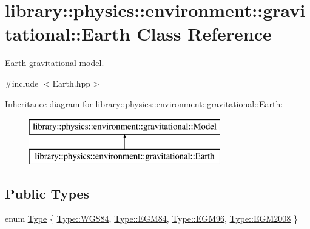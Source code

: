 \hypertarget{classlibrary_1_1physics_1_1environment_1_1gravitational_1_1_earth}{}\section{library\+:\+:physics\+:\+:environment\+:\+:gravitational\+:\+:Earth Class Reference}
\label{classlibrary_1_1physics_1_1environment_1_1gravitational_1_1_earth}


\hyperlink{classlibrary_1_1physics_1_1environment_1_1gravitational_1_1_earth}{Earth} gravitational model.  




{\ttfamily \#include $<$Earth.\+hpp$>$}

Inheritance diagram for library\+:\+:physics\+:\+:environment\+:\+:gravitational\+:\+:Earth\+:\begin{figure}[H]
\begin{center}
\leavevmode
\includegraphics[height=2.000000cm]{classlibrary_1_1physics_1_1environment_1_1gravitational_1_1_earth}
\end{center}
\end{figure}
\subsection*{Public Types}
\begin{DoxyCompactItemize}
\item 
enum \hyperlink{classlibrary_1_1physics_1_1environment_1_1gravitational_1_1_earth_ab20a2b260831c66ac10f7b9a307d25ca}{Type} \{ \hyperlink{classlibrary_1_1physics_1_1environment_1_1gravitational_1_1_earth_ab20a2b260831c66ac10f7b9a307d25caa5dda43a21474cf33e7088b8247f19c4b}{Type\+::\+W\+G\+S84}, 
\hyperlink{classlibrary_1_1physics_1_1environment_1_1gravitational_1_1_earth_ab20a2b260831c66ac10f7b9a307d25caa2ae5659e79a4bb66ae4ee8cb033ef196}{Type\+::\+E\+G\+M84}, 
\hyperlink{classlibrary_1_1physics_1_1environment_1_1gravitational_1_1_earth_ab20a2b260831c66ac10f7b9a307d25caa7c7ad846cb98dafc9309087d3ba36013}{Type\+::\+E\+G\+M96}, 
\hyperlink{classlibrary_1_1physics_1_1environment_1_1gravitational_1_1_earth_ab20a2b260831c66ac10f7b9a307d25caaf22fbbe07f6feeaa3d6446dabcd8b164}{Type\+::\+E\+G\+M2008}
 \}
\end{DoxyCompactItemize}
